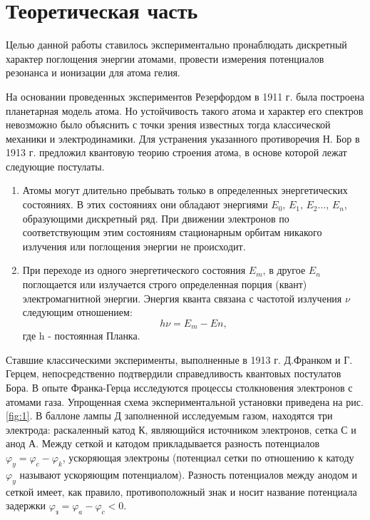 



\def\labauthors{Понур К.А., Сарафанов Ф.Г., Сидоров Д.А.}
\def\labgroup{430}
\def\labnumber{5}
\def\labtheme{Опыт Франка-Герца}
\renewcommand{\phi}{\varphi}


\section{Теоретическая часть}
Целью данной работы ставилось экспериментально пронаблюдать дискретный характер поглощения энергии атомами, провести измерения потенциалов резонанса и ионизации для атома гелия.

На основании проведенных экспериментов Резерфордом в 1911 г. была построена планетарная модель атома. Но устойчивость такого атома и характер его спектров невозможно было объяснить с точки зрения известных тогда классической механики и электродинамики. Для устранения указанного противоречия Н. Бор в 1913 г. предложил квантовую теорию строения атома, в основе которой лежат следующие постулаты.

\begin{enumerate}
    \item Атомы могут длительно пребывать только в определенных энергетических состояниях. В этих состояниях они обладают энергиями $E_0,\,E_1,\,E_2\dots,\,E_n$, образующими дискретный ряд. При движении электронов по соответствующим этим состояниям стационарным орбитам никакого излучения или поглощения энергии не происходит.
    \item При переходе из одного энергетического состояния $E_m$, в другое $E_n$ поглощается или излучается строго определенная порция (квант) электромагнитной энергии. Энергия кванта связана с частотой излучения $\nu$ следующим отношением: $$h\nu=E_m-En, $$ где h - постоянная Планка.
\end{enumerate}	

Ставшие классическими эксперименты, выполненные в 1913 г. Д.Франком и Г. Герцем, непосредственно подтвердили справедливость квантовых постулатов Бора. В опыте Франка-Герца исследуются процессы столкновения электронов с атомами газа. Упрощенная схема экспериментальной установки приведена на рис.\ref{fig:1}. В баллоне лампы Д заполненной исследуемым газом, находятся три электрода: раскаленный катод К, являющийся источником электронов, сетка С и анод А. Между сеткой и катодом прикладывается разность потенциалов $\phi_{y} =\phi_{c} -\phi_{k}$, ускоряющая электроны (потенциал сетки по отношению к катоду $\phi_y$ называют ускоряющим потенциалом). Разность потенциалов между анодом и сеткой имеет, как правило, противоположный знак и носит название потенциала задержки $\phi_{\text{з}} =\phi_{a} -\phi_{c}<0$.

